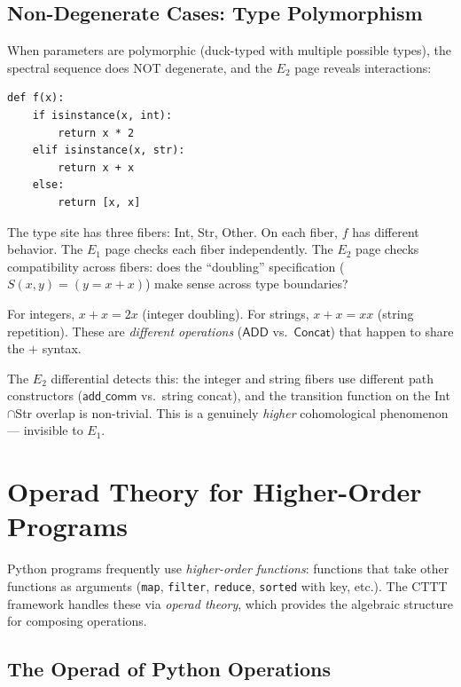 \section{Non-Degenerate Cases: Type Polymorphism}

When parameters are polymorphic (duck-typed with multiple possible
types), the spectral sequence does NOT degenerate, and the $E_2$
page reveals interactions:

\begin{example}
\begin{lstlisting}
def f(x):
    if isinstance(x, int):
        return x * 2
    elif isinstance(x, str):
        return x + x
    else:
        return [x, x]
\end{lstlisting}

The type site has three fibers: Int, Str, Other.  On each fiber,
$f$ has different behavior.  The $E_1$ page checks each fiber
independently.  The $E_2$ page checks compatibility across fibers:
does the ``doubling'' specification ($S(x, y) = (y = x + x)$)
make sense across type boundaries?

For integers, $x + x = 2x$ (integer doubling).
For strings, $x + x = xx$ (string repetition).
These are \emph{different operations} ($\mathsf{ADD}$ vs.\
$\mathsf{Concat}$) that happen to share the $+$ syntax.

The $E_2$ differential detects this: the integer and string fibers
use different path constructors ($\mathsf{add\_comm}$ vs.\ string
concat), and the transition function on the Int$\cap$Str overlap
is non-trivial.  This is a genuinely \emph{higher} cohomological
phenomenon --- invisible to $E_1$.
\end{example}


\chapter{Operad Theory for Higher-Order Programs}
\label{ch:operads}

Python programs frequently use \emph{higher-order functions}:
functions that take other functions as arguments (\texttt{map},
\texttt{filter}, \texttt{reduce}, \texttt{sorted} with key, etc.).
The CTTT framework handles these via \emph{operad theory}, which
provides the algebraic structure for composing operations.

\section{The Operad of Python Operations}

